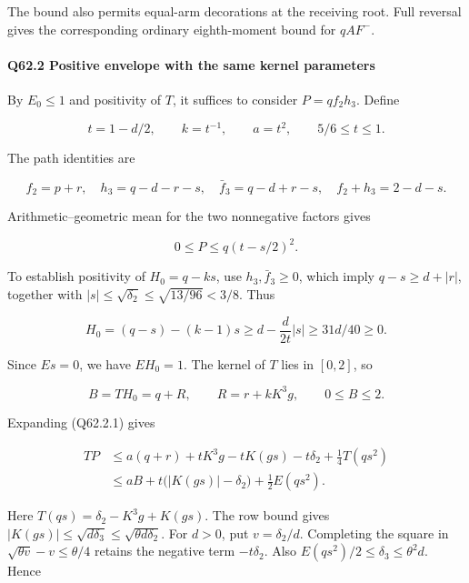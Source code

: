 The bound also permits equal-arm decorations at the receiving root. Full reversal gives the corresponding
ordinary eighth-moment bound for $qAF^-$.



\paragraph{Q62.2 Positive envelope with the same kernel parameters}

By $E_0\le\allowbreak 1$ and positivity of $T$, it suffices to consider $P=\allowbreak qf_2h_3$.
Define

\[
t=1-d/2,\qquad k=t^{-1},\qquad a=t^2,
\qquad 5/6\le t\le1.
\]

The path identities are

\[
f_2=p+r,\quad h_3=q-d-r-s,\quad \bar f_3=q-d+r-s,
\quad f_2+h_3=2-d-s.
\]

Arithmetic--geometric mean for the two nonnegative factors gives

\[
0\le P\le q(t-s/2)^2.
\tag{Q62.2.1}\label{eq:Q62:Q62:2:1}
\]

To establish positivity of $H_0=\allowbreak q-ks$, use $h_3,\allowbreak  \bar f_3\ge\allowbreak 0$, which imply
$q-s\ge\allowbreak  d+|r|$, together with
$|s|\le\allowbreak \sqrt{\delta_2}\le\allowbreak \sqrt{13/96}<\allowbreak 3/8$. Thus

\[
H_0=(q-s)-(k-1)s
\ge d-\frac{d}{2t}|s|\ge31d/40\ge0.
\]

Since $Es=\allowbreak 0$, we have $EH_0=\allowbreak 1$. The kernel of $T$ lies in $[0,\allowbreak  2]$, so

\[
B=TH_0=q+R,\qquad R=r+kK^3g,\qquad 0\le B\le2.
\tag{Q62.2.2}\label{eq:Q62:Q62:2:2}
\]


Expanding (Q62.2.1) gives

\[
\begin{aligned}
TP&\le a(q+r)+tK^3g-tK(gs)-t\delta_2+\tfrac14T(qs^2)\\
&\le aB+t\bigl(|K(gs)|-\delta_2\bigr)+\tfrac12E(qs^2).
\end{aligned}
\]

Here $T(qs)=\allowbreak \delta_2-K^3g+K(gs)$. The row bound gives
$|K(gs)|\le\allowbreak \sqrt{d\delta_3}\le\allowbreak \sqrt{\theta d\delta_2}$.
For $d>\allowbreak 0$, put $v=\allowbreak \delta_2/d$. Completing the square in
$\sqrt{\theta v}-v\le\allowbreak \theta/4$ retains the negative term $-t\delta_2$.
Also $E(qs^2)/2\le\allowbreak  \delta_3\le\allowbreak \theta^2d$. Hence

